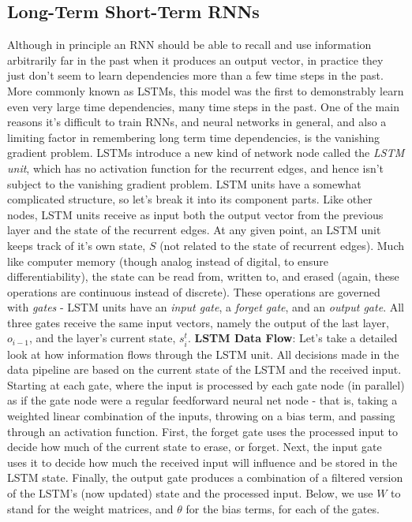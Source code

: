 \documentclass{article}
\begin{document}
\subsection{Long-Term Short-Term RNNs}
Although in principle an RNN should be able to recall and use information arbitrarily far in the past when it produces an output vector, in practice they just don't seem to learn dependencies more than a few time steps in the past. More commonly known as LSTMs, this model was the first to demonstrably learn even very large time dependencies, many time steps in the past. One of the main reasons it's difficult to train RNNs, and neural networks in general, and also a limiting factor in remembering long term time dependencies, is the vanishing gradient problem. LSTMs introduce a new kind of network node called the \textit{LSTM unit}, which has no activation function for the recurrent edges, and hence isn't subject to the vanishing gradient problem.
\newline
LSTM units have a somewhat complicated structure, so let's break it into its component parts. Like other nodes, LSTM units receive as input both the output vector from the previous layer and the state of the recurrent edges. At any given point, an LSTM unit keeps track of it's own state, $ S $ (not related to the state of recurrent edges). Much like computer memory (though analog instead of digital, to ensure differentiability), the state can be read from, written to, and erased (again, these operations are continuous instead of discrete). These operations are governed with \textit{gates} - LSTM units have an \textit{input gate}, a \textit{forget gate}, and an \textit{output gate}. All three gates receive the same input vectors, namely the output of the last layer, $ o_{i - 1} $, and the layer's current state, $ s_i^t $. 
\newline \newline
\textbf{LSTM Data Flow}: Let's take a detailed look at how information flows through the LSTM unit. All decisions made in the data pipeline are based on the current state of the LSTM and the received input. Starting at each gate, where the input is processed by each gate node (in parallel) as if the gate node were a regular feedforward neural net node - that is, taking a weighted linear combination of the inputs, throwing on a bias term, and passing through an activation function. First, the forget gate uses the processed input to decide how much of the current state to erase, or forget. Next, the input gate uses it to decide how much the received input will influence and be stored in the LSTM state. Finally, the output gate produces a combination of a filtered version of the LSTM's (now updated) state and the processed input. Below, we use $ W $ to stand for the weight matrices, and $ \theta $ for the bias terms, for each of the gates. 
\end{document}
